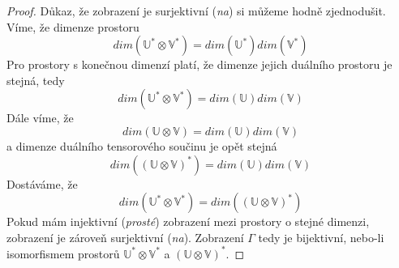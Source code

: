 \documentclass[a5paper,12pt]{amsbook}
\theoremstyle{definition}
\newcommand{\myspace}[1]{\mathbb{#1}}
\begin{document}
\begin{proof}
\medskip\noindent
Důkaz, že zobrazení je surjektivní (\textit{na}) si můžeme hodně zjednodušit. Víme, že dimenze
prostoru
\begin{equation*}
dim(\myspace{U^*}\otimes\myspace{V^*}) = dim(\myspace{U^*})dim(\myspace{V^*})
\end{equation*}
Pro prostory s konečnou dimenzí platí, že dimenze jejich duálního prostoru je stejná, tedy
\begin{equation*}
dim(\myspace{U^*}\otimes\myspace{V^*}) = dim(\myspace{U})dim(\myspace{V})
\end{equation*}
Dále víme, že
\begin{equation*}
dim(\myspace{U}\otimes\myspace{V}) = dim(\myspace{U})dim(\myspace{V})
\end{equation*}
a dimenze duálního tensorového součinu je opět stejná
\begin{equation*}
dim((\myspace{U}\otimes\myspace{V})^*) = dim(\myspace{U})dim(\myspace{V})
\end{equation*}
Dostáváme, že
\begin{equation*}
dim(\myspace{U^*}\otimes\myspace{V^*}) = dim((\myspace{U}\otimes\myspace{V})^*)
\end{equation*}
Pokud mám injektivní (\textit{prosté}) zobrazení mezi prostory o stejné dimenzi, zobrazení je
zároveň surjektivní (\textit{na}). Zobrazení $\Gamma$ tedy je bijektivní, nebo-li isomorfismem
prostorů $\myspace{U^*}\otimes\myspace{V^*}$ a $(\myspace{U}\otimes\myspace{V})^*$.
\end{proof}
\end{document}
